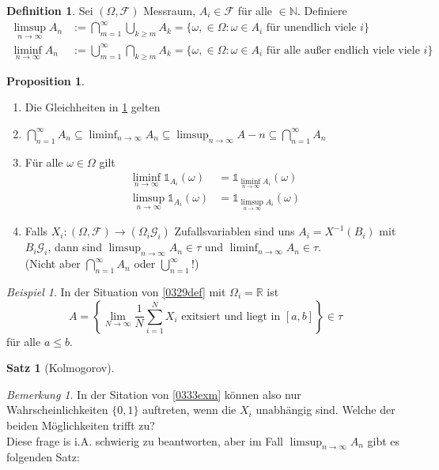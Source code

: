 \documentclass[10pt,a4paper]{article}
\newcommand{\N}{\ensuremath{\mathbb{N}}}
\newcommand{\R}{\ensuremath{\mathbb{R}}}
\newcommand{\cha}{\mathds{1}}
\newcommand{\scF}{\ensuremath{\mathscr{F}}}
\newcommand{\scG}{\mathscr G}
\theoremstyle{plain}
\newtheorem{satz}[theorem]{Satz}
\theoremstyle{definition}
\newtheorem{definition}[theorem]{Definition}
\newtheorem{prop}[theorem]{Proposition}
\theoremstyle{remark}
\newtheorem*{bem*}{Bemerkung}
\newtheorem{exm}[theorem]{Beispiel}
\begin{document}
	\begin{definition}\label{0332def}
		Sei $(\Omega,\scF)$ Messraum, $A_i\in \scF$ für alle $\in\N$. Definiere
		\begin{align*}
		\limsup_{n\to\infty}A_n&:=\bigcap_{m=1}^\infty\bigcup_{k\geq m}A_k=\{\omega,\in\Omega:\text{$\omega\in A_i$ für unendlich viele $i$}\}\\
		\liminf_{n\to\infty}A_n&:=\bigcup_{m=1}^\infty\bigcap_{k\geq m}A_k=\{\omega,\in\Omega:\text{$\omega\in A_i$ für alle außer endlich viele viele $i$}\}
		\end{align*}
	\end{definition}
	
	\begin{prop}
		\begin{enumerate}[label=\alph*)]
			\item Die Gleichheiten in \ref{0332def} gelten
			\item $\bigcap_{n=1}^\infty A_n\subseteq\liminf_{n\to\infty}A_n\subseteq\limsup_{n\to\infty}A-n\subseteq\bigcap_{n=1}^\infty A_n$
			\item Für alle $\omega\in\Omega$ gilt 
			\begin{align*}
				\liminf_{n\to\infty}\cha_{A_i}(\omega)&=\cha_{\liminf_{n\to\infty}A_i}(\omega)\\
				\limsup_{n\to\infty}\cha_{A_i}(\omega)&=\cha_{\limsup_{n\to\infty}A_i}(\omega)
			\end{align*}
			\item Falls $X_i:(\Omega,\scF)\to(\Omega_i\scG_i)$ Zufallsvariablen sind uns $A_i=X^{-1}(B_i)$ mit $B_i\scG_i$, dann sind $\limsup_{n\to\infty} A_n\in\tau$ und $\liminf_{n\to\infty}A_n\in \tau$.\\
			(Nicht aber $\bigcap_{n=1}^\infty A_n$ oder $\bigcup_{n=1}^\infty$!)
		\end{enumerate}
	\end{prop}
	
	\begin{exm}
		In der Situation von \ref{0329def} mit $\Omega_i=\R$ ist
		\[A=\left\{\lim\limits_{N\to\infty}\frac{1}{N}\sum_{i=1}^{N}X_i\text{ exitsiert und liegt in $[a,b]$}\right\}\in\tau\]
		für alle $a\leq b$.
	\end{exm}
	

	\begin{satz}[Kolmogorov]
	\end{satz}

	\begin{bem*}
		In der Sitation von \ref{0333exm} können also nur Wahrscheinlichkeiten $\{0,1\}$ auftreten, wenn die $X_i$ unabhängig sind. Welche der beiden Möglichkeiten trifft zu?\\
		Diese frage is i.A. schwierig zu beantworten, aber im Fall $\limsup_{n\to\infty}A_n$ gibt es folgenden Satz:
	\end{bem*}
\end{document}
